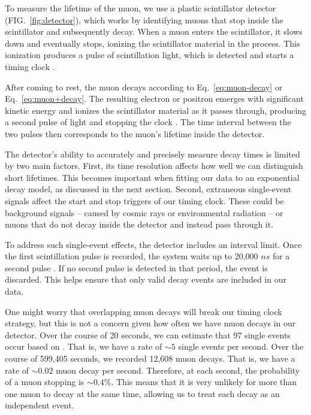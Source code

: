 \documentclass{../paper}
\begin{document}
To measure the lifetime of the muon, we use a plastic scintillator detector (FIG.~\ref{fig:detector}), which works by identifying muons that stop inside the scintillator and subsequently decay. When a muon enters the scintillator, it slows down and eventually stops, ionizing the scintillator material in the process. This ionization produces a pulse of scintillation light, which is detected and starts a timing clock \cite{TeachSpinManual}.

After coming to rest, the muon decays according to Eq.~\eqref{eq:muon-decay} or Eq.~\eqref{eq:muon+decay}. The resulting electron or positron emerges with significant kinetic energy and ionizes the scintillator material as it passes through, producing a second pulse of light and stopping the clock \cite{TeachSpinManual}. The time interval between the two pulses then corresponds to the muon's lifetime inside the detector.

The detector's ability to accurately and precisely measure decay times is limited by two main factors. First, its time resolution affects how well we can distinguish short lifetimes. This becomes important when fitting our data to an exponential decay model, as discussed in the next section. Second, extraneous single-event signals affect the start and stop triggers of our timing clock. These could be background signals -- caused by cosmic rays or environmental radiation -- or muons that do not decay inside the detector and instead pass through it.

To address such single-event effects, the detector includes an interval limit. Once the first scintillation pulse is recorded, the system waits up to 20,000 $ns$ for a second pulse \cite{TeachSpinManual}. If no second pulse is detected in that period, the event is discarded. This helps ensure that only valid decay events are included in our data.

One might worry that overlapping muon decays will break our timing clock strategy, but this is not a concern given how often we have muon decays in our detector. Over the course of 20 seconds, we can estimate that 97 single events occur based on \cite{Sage}. That is, we have a rate of $\sim 5$ single events per second. Over the course of 599,405 seconds, we recorded 12,608 muon decays. That is, we have a rate of $\sim 0.02$ muon decay per second. Therefore, at each second, the probability of a muon stopping is $\sim 0.4\%$. This means that it is very unlikely for more than one muon to decay at the same time, allowing us to treat each decay as an independent event.
\end{document}

